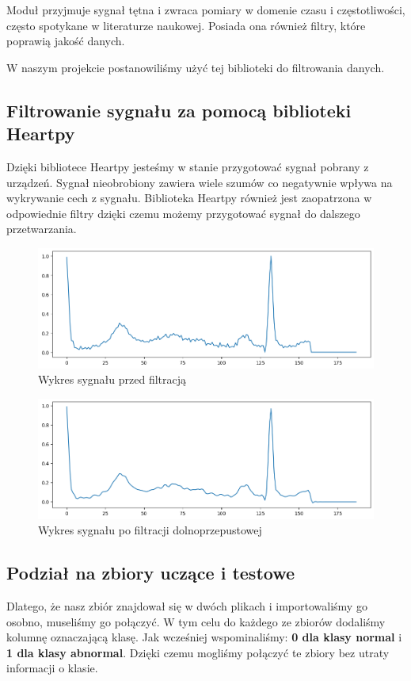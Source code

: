 \documentclass[12pt,a4paper]{article}
\begin{document}
Moduł przyjmuje sygnał tętna i zwraca pomiary w domenie czasu i częstotliwości, często spotykane w literaturze naukowej. Posiada ona również filtry, które poprawią jakość danych.

W naszym projekcie postanowiliśmy użyć tej biblioteki do filtrowania danych.

\subsection{Filtrowanie sygnału za pomocą biblioteki Heartpy} \label{sec:filtrowanie}
Dzięki bibliotece Heartpy jesteśmy w stanie przygotować sygnał pobrany z urządzeń. Sygnał nieobrobiony zawiera wiele szumów co negatywnie wpływa na wykrywanie cech z sygnału. Biblioteka Heartpy również jest zaopatrzona w odpowiednie filtry dzięki czemu możemy przygotować sygnał do dalszego przetwarzania.

\begin{figure}[H]
    \centering
    \includegraphics[width=1\linewidth]{heartpy-nofilter.png}
    \caption{Wykres sygnału przed filtracją}
\end{figure}

\begin{figure}[H]
    \centering
    \includegraphics[width=1\linewidth]{images/heartpy-filter.png}
    \caption{Wykres sygnału po filtracji dolnoprzepustowej}
\end{figure}

\subsection{Podział na zbiory uczące i testowe}
Dlatego, że nasz zbiór znajdował się w dwóch plikach i importowaliśmy go osobno, museliśmy go połączyć. W tym celu do każdego ze zbiorów dodaliśmy kolumnę oznaczającą klasę. Jak wcześniej wspominaliśmy: \textbf{0 dla klasy normal} i \textbf{1 dla klasy abnormal}. Dzięki czemu mogliśmy połączyć te zbiory bez utraty informacji o klasie.
\end{document}
